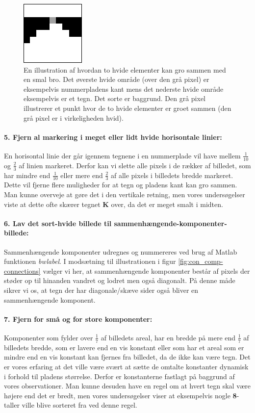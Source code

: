\begin{figure}[htp]
\centering
\includegraphics{implementation/illu/cc_remove_thin_line.png} 
\caption{En illustration af hvordan to hvide elementer kan gro sammen med en smal bro. Det øverste hvide område (over den grå pixel) er eksempelvis nummerpladens kant mens det nederste hvide område eksempelvis er et tegn. Det sorte er baggrund. Den grå pixel illustrerer et punkt hvor de to hvide elementer er groet sammen (den grå pixel er i virkeligheden hvid).}
\label{fig:tynd_linie}
\end{figure}

\paragraph{5. Fjern al markering i meget eller lidt hvide horisontale linier:} En horisontal linie der går igennem tegnene i en nummerplade vil have mellem $\frac{1}{10}$ og $\frac{2}{3}$ af linien markeret. Derfor kan vi slette alle pixels i de rækker af billedet, som har mindre end $\frac{1}{10}$ eller mere end $\frac{2}{3}$ af alle pixels i billedets bredde markeret. Dette vil fjerne flere muligheder for at tegn og pladens kant kan gro sammen. Man kunne overveje at gøre det i den vertikale retning, men vores undersøgelser viste at dette ofte skærer tegnet \textbf{K} over, da det er meget smalt i midten.

\paragraph{6. Lav det sort-hvide billede til sammenhængende-komponenter-billede:} Sammenhængende komponenter udregnes og nummereres ved brug af Matlab funktionen \textit{bwlabel}. I modsætning til illustrationen i figur \vref{fig:con_comp-connections} vælger vi her, at sammenhængende komponenter består af pixels der støder op til hinanden vandret og lodret men også diagonalt. På denne måde sikrer vi os, at tegn der har diagonale/skæve sider også bliver en sammenhængende komponent.

\paragraph{7. Fjern for små og for store komponenter:} Komponenter som fylder over $\frac{1}{7}$ af billedets areal, har en bredde på mere end $\frac{1}{7}$ af billedets bredde, som er lavere end en vis konstant eller som har et areal som er mindre end en vis konstant kan fjernes fra billedet, da de ikke kan være tegn. Det er vores erfaring at det ville være svært at sætte de omtalte konstanter dynamisk i forhold til pladens størrelse. Derfor er konstanterne fastlagt på baggrund af vores observationer. Man kunne desuden have en regel om at hvert tegn skal være højere end det er bredt, men vores undersøgelser viser at eksempelvis nogle \textbf{8}-taller ville blive sorteret fra ved denne regel.

